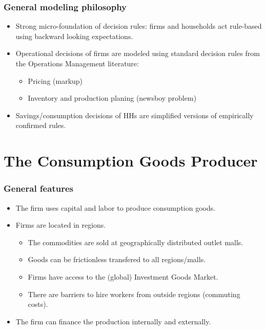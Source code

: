 \documentclass{beamer}
\begin{document}
\frame
{
  \frametitle{General modeling philosophy} 
\begin{itemize}
\item Strong micro-foundation of decision rules:
 firms and households act rule-based using backward looking expectations. 

\item Operational decisions of firms are modeled using standard decision rules from the Operations Management literature: 
\begin{itemize}
	\item Pricing (markup)
\item Inventory and production planing (newsboy problem)
\end{itemize}

\item Savings/consumption decisions of HHs are simplified versions of empirically confirmed rules.

	
\end{itemize}


}



\section{The Consumption Goods Producer}



\frame
{
  \frametitle{General features} 
\begin{itemize}
	\item The firm uses capital and labor to produce consumption goods.
	\item Firms are located in regions.
		
\begin{itemize}
	\item The commodities are sold at geographically distributed outlet malls.
	\item Goods can be frictionless transfered to all regions/malls.
	\item Firms have access to the (global) Investment Goods Market.
	\item There are barriers to hire workers from outside regions (commuting costs).
\end{itemize}

	\item The firm can finance the production internally and externally.
	\end{itemize}


}
\end{document}
